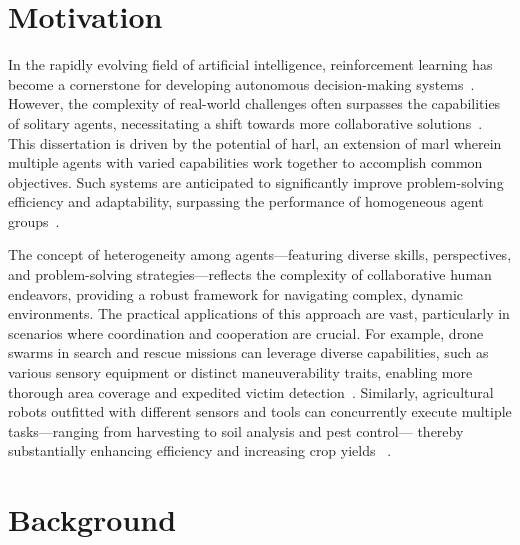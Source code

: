 \section{Motivation}%
\label{sec:motivation}

In the rapidly evolving field of artificial intelligence, reinforcement learning has become a 
cornerstone for developing autonomous decision-making systems~\cite{sutton2018}.
However, the complexity of real-world challenges often surpasses the capabilities of solitary 
agents, necessitating a shift towards more collaborative solutions~\cite{cao2012}.
This dissertation is driven by the potential of \gls{harl}, an extension of \gls{marl}
wherein multiple agents with varied capabilities work together to accomplish common objectives. 
Such systems are anticipated to significantly improve problem-solving efficiency and adaptability, 
surpassing the performance of homogeneous agent groups~\cite{calvo2018}.

The concept of heterogeneity among agents—featuring diverse skills, perspectives, 
and problem-solving strategies—reflects the complexity of collaborative human endeavors, 
providing a robust framework for navigating complex, dynamic environments. 
The practical applications of this approach are vast, 
particularly in scenarios where coordination and cooperation are crucial. 
For example, drone swarms in search and rescue missions can leverage diverse capabilities, 
such as various sensory equipment or distinct maneuverability traits, 
enabling more thorough area coverage and expedited victim detection~\cite{hoang2023,kouzeghar2023}.
Similarly, agricultural robots outfitted with different sensors and tools can concurrently 
execute multiple tasks—ranging from harvesting to soil analysis and pest control—
thereby substantially enhancing efficiency and increasing crop yields~%
\cite{carbone2018,amarasinghe2019}.


\section{Background}%
\label{sec:background}

